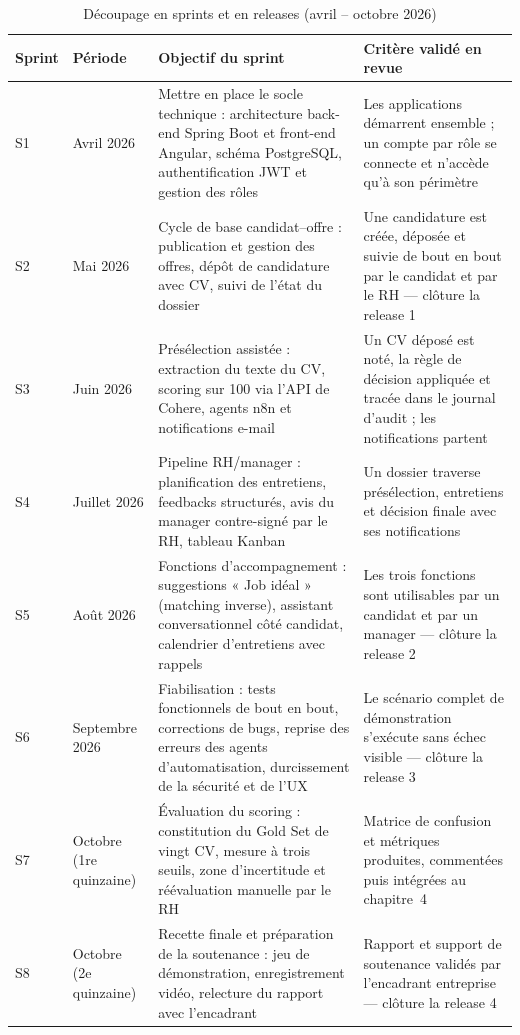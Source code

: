 \setcounter{table}{2}
\begin{table}[!ht]
\centering
\caption{Découpage en sprints et en releases (avril – octobre 2026)}
\label{tab_1_3}
\renewcommand{\arraystretch}{1.25}\footnotesize
\setlength{\tabcolsep}{4pt}%
\begin{tabular}{|P{0.050\textwidth}|P{0.125\textwidth}|P{0.400\textwidth}|P{0.325\textwidth}|}
\hline
\textbf{Sprint} & \textbf{Période} & \textbf{Objectif du sprint} & \textbf{Critère validé en revue} \\
\hline
S1 & Avril 2026 & Mettre en place le socle technique : architecture back-end Spring Boot et front-end Angular, schéma PostgreSQL, authentification JWT et gestion des rôles & Les applications démarrent ensemble ; un compte par rôle se connecte et n’accède qu’à son périmètre \\
\hline
S2 & Mai 2026 & Cycle de base candidat–offre : publication et gestion des offres, dépôt de candidature avec CV, suivi de l’état du dossier & Une candidature est créée, déposée et suivie de bout en bout par le candidat et par le RH — clôture la release 1 \\
\hline
S3 & Juin 2026 & Présélection assistée : extraction du texte du CV, scoring sur 100 via l’API de Cohere, agents n8n et notifications e-mail & Un CV déposé est noté, la règle de décision appliquée et tracée dans le journal d’audit ; les notifications partent \\
\hline
S4 & Juillet 2026 & Pipeline RH/manager : planification des entretiens, feedbacks structurés, avis du manager contre-signé par le RH, tableau Kanban & Un dossier traverse présélection, entretiens et décision finale avec ses notifications \\
\hline
S5 & Août 2026 & Fonctions d’accompagnement : suggestions « Job idéal » (matching inverse), assistant conversationnel côté candidat, calendrier d’entretiens avec rappels & Les trois fonctions sont utilisables par un candidat et par un manager — clôture la release 2 \\
\hline
S6 & Septembre 2026 & Fiabilisation : tests fonctionnels de bout en bout, corrections de bugs, reprise des erreurs des agents d’automatisation, durcissement de la sécurité et de l’UX & Le scénario complet de démonstration s’exécute sans échec visible — clôture la release 3 \\
\hline
S7 & Octobre (1re quinzaine) & Évaluation du scoring : constitution du Gold Set de vingt CV, mesure à trois seuils, zone d’incertitude et réévaluation manuelle par le RH & Matrice de confusion et métriques produites, commentées puis intégrées au chapitre~4 \\
\hline
S8 & Octobre (2e quinzaine) & Recette finale et préparation de la soutenance : jeu de démonstration, enregistrement vidéo, relecture du rapport avec l’encadrant & Rapport et support de soutenance validés par l’encadrant entreprise — clôture la release 4 \\
\hline
\end{tabular}
\end{table}

